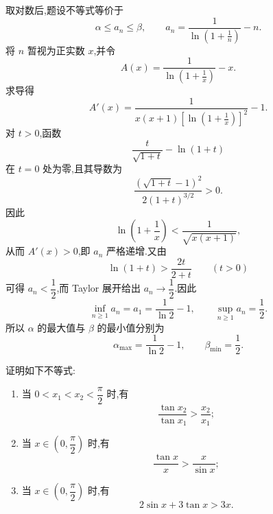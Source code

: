\begin{solution}
    取对数后,题设不等式等价于
    \[
        \alpha\leq a_n\leq\beta,
        \qquad
        a_n=\dfrac{1}{\ln(1+\frac{1}{n})}-n.
    \]
    将 $n$ 暂视为正实数 $x$,并令
    \[
        A(x)=\dfrac{1}{\ln(1+\frac{1}{x})}-x.
    \]
    求导得
    \[
        A'(x)=\dfrac{1}{x(x+1)\left[\ln(1+\frac{1}{x})\right]^2}-1.
    \]
    对 $t>0$,函数
    \[
        \dfrac{t}{\sqrt{1+t}}-\ln(1+t)
    \]
    在 $t=0$ 处为零,且其导数为
    \[
        \dfrac{(\sqrt{1+t}-1)^2}{2(1+t)^{3/2}}>0.
    \]
    因此
    \[
        \ln\left(1+\dfrac{1}{x}\right)
        <\dfrac{1}{\sqrt{x(x+1)}},
    \]
    从而 $A'(x)>0$,即 $a_n$ 严格递增.又由
    \[
        \ln(1+t)>\dfrac{2t}{2+t}
        \qquad(t>0)
    \]
    可得 $a_n<\dfrac{1}{2}$,而 Taylor 展开给出 $a_n\to\dfrac{1}{2}$.因此
    \[
        \inf\limits_{n\geq1}a_n=a_1=\dfrac{1}{\ln2}-1,
        \qquad
        \sup\limits_{n\geq1}a_n=\dfrac{1}{2}.
    \]
    所以 $\alpha$ 的最大值与 $\beta$ 的最小值分别为
    \[
        \boxed{\alpha_{\max}=\dfrac{1}{\ln2}-1},
        \qquad
        \boxed{\beta_{\min}=\dfrac{1}{2}}.
    \]
\end{solution}

\begin{example}
    证明如下不等式:
    \begin{enumerate}
        \item 当 $0<x_1<x_2<\dfrac{\pi}{2}$ 时,有
              \[
                  \dfrac{\tan x_2}{\tan x_1}>\dfrac{x_2}{x_1};
              \]
        \item 当 $x\in\left(0,\dfrac{\pi}{2}\right)$ 时,有
              \[
                  \dfrac{\tan x}{x}>\dfrac{x}{\sin x};
              \]
        \item 当 $x\in\left(0,\dfrac{\pi}{2}\right)$ 时,有
              \[
                  2\sin x+3\tan x>3x.
              \]
    \end{enumerate}
\end{example}
\exampleblank

